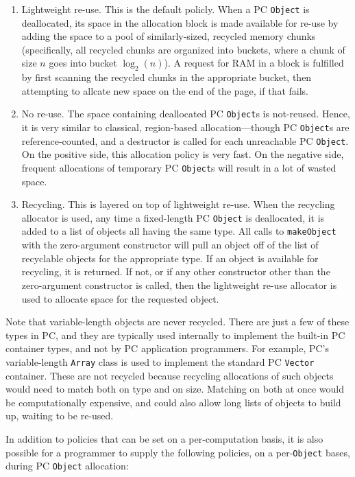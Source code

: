 \begin{enumerate}

\item Lightweight re-use.  This is the default policly.  When a PC \texttt{Object} is deallocated, its space in the allocation block is made available for re-use by
adding the space to a pool of similarly-sized, recycled memory chunks (specifically, all recycled chunks are organized into buckets, where a chunk of size
$n$ goes into bucket $\log_2 (n)$).  A request for RAM in a block is fulfilled by first scanning the recycled chunks in the appropriate bucket, then
attempting to allcate new space on the end of the page, if that fails.
\item No re-use.  The space containing deallocated PC \texttt{Object}s is not-reused.  Hence, it is very similar to classical, region-based allocation---though PC \texttt{Object}s
are reference-counted, and a destructor is called for each unreachable PC \texttt{Object}.
On the positive side, this allocation policy is very fast.  On the negative side, frequent allocations of temporary PC \texttt{Object}s will result in a lot of wasted space.
\item Recycling.  This is layered on top of lightweight re-use.  When the recycling allocator is used, any time a fixed-length
PC \texttt{Object} is deallocated, it is
added to a list of objects all having the same type.  All calls to \texttt{makeObject} with the zero-argument constructor will
pull an object off of the list of recyclable objects for the appropriate type.  
If an object is available for recycling, it is returned.  If not, or if any other constructor other than the zero-argument constructor is called, 
then the lightweight re-use allocator is used to allocate space for the requested
object.

\end{enumerate}

Note that
variable-length objects are never recycled.  There are just a few of these types in PC, and they are typically
used internally to implement the built-in PC container
types, and not by PC application programmers.  For example, PC's variable-length
\texttt{Array} class is used to implement the standard PC \texttt{Vector} container.  
These are not recycled because recycling allocations of such objects would need to match both on type and on size.  Matching on both at once would 
be computationally expensive, and could also allow long lists of objects to build up, waiting to be re-used.

In addition to policies that can be set on a per-computation basis,
it is also possible for a programmer to supply the following policies, on a per-\texttt{Object} bases, during PC \texttt{Object} allocation:

